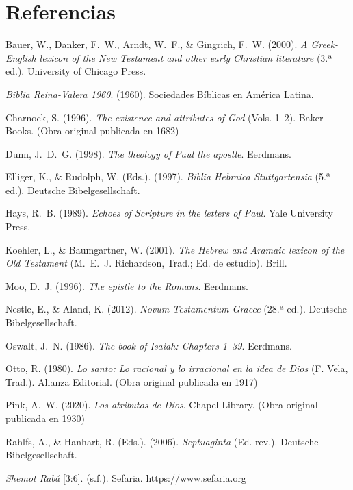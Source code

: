 \documentclass[11pt,letterpaper]{article}
\newcommand{\refapa}[1]{\par{\RaggedRight\hangindent=1.27cm\hangafter=1\noindent #1\par}\vspace{4pt}}
\begin{document}
\section*{Referencias}
\refapa{Bauer, W., Danker, F.~W., Arndt, W.~F., \& Gingrich, F.~W. (2000). \emph{A Greek-English lexicon of the New Testament and other early Christian literature} (3.ª ed.). University of Chicago Press.}
\refapa{\emph{Biblia Reina-Valera 1960}. (1960). Sociedades Bíblicas en América Latina.}
\refapa{Charnock, S. (1996). \emph{The existence and attributes of God} (Vols. 1--2). Baker Books. (Obra original publicada en 1682)}
\refapa{Dunn, J.~D.~G. (1998). \emph{The theology of Paul the apostle}. Eerdmans.}
\refapa{Elliger, K., \& Rudolph, W. (Eds.). (1997). \emph{Biblia Hebraica Stuttgartensia} (5.ª ed.). Deutsche Bibelgesellschaft.}
\refapa{Hays, R.~B. (1989). \emph{Echoes of Scripture in the letters of Paul}. Yale University Press.}
\refapa{Koehler, L., \& Baumgartner, W. (2001). \emph{The Hebrew and Aramaic lexicon of the Old Testament} (M.~E.~J. Richardson, Trad.; Ed. de estudio). Brill.}
\refapa{Moo, D.~J. (1996). \emph{The epistle to the Romans}. Eerdmans.}
\refapa{Nestle, E., \& Aland, K. (2012). \emph{Novum Testamentum Graece} (28.ª ed.). Deutsche Bibelgesellschaft.}
\refapa{Oswalt, J.~N. (1986). \emph{The book of Isaiah: Chapters 1--39}. Eerdmans.}
\refapa{Otto, R. (1980). \emph{Lo santo: Lo racional y lo irracional en la idea de Dios} (F. Vela, Trad.). Alianza Editorial. (Obra original publicada en 1917)}
\refapa{Pink, A.~W. (2020). \emph{Los atributos de Dios}. Chapel Library. (Obra original publicada en 1930)}
\refapa{Rahlfs, A., \& Hanhart, R. (Eds.). (2006). \emph{Septuaginta} (Ed. rev.). Deutsche Bibelgesellschaft.}
\refapa{\emph{Shemot Rabá} [3:6]. (s.f.). Sefaria. https://www.sefaria.org}
\end{document}
